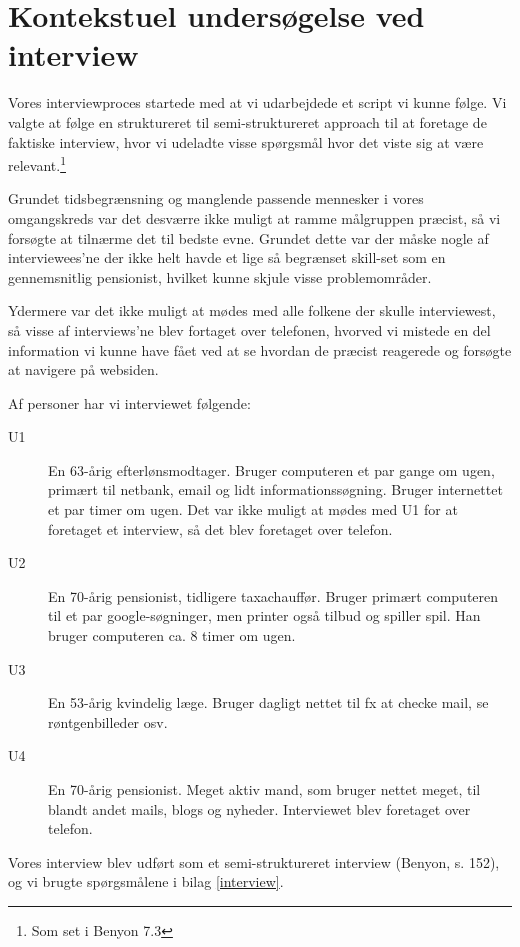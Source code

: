 \section{Kontekstuel undersøgelse ved interview}

Vores interviewproces startede med at vi udarbejdede et script vi kunne følge. Vi valgte at følge en struktureret til semi-struktureret approach til at foretage de faktiske interview, hvor vi udeladte visse spørgsmål hvor det viste sig at være relevant.\footnote{Som set i Benyon 7.3}

Grundet tidsbegrænsning og manglende passende mennesker i vores omgangskreds var det desværre ikke muligt at ramme målgruppen præcist, så vi forsøgte at tilnærme det til bedste evne. Grundet dette var der måske nogle af interviewees'ne der ikke helt havde et lige så begrænset skill-set som en gennemsnitlig pensionist, hvilket kunne skjule visse problemområder.

Ydermere var det ikke muligt at mødes med alle folkene der skulle interviewest, så visse af interviews'ne blev fortaget over telefonen, hvorved vi mistede en del information vi kunne have fået ved at se hvordan de præcist reagerede og forsøgte at navigere på websiden.

Af personer har vi interviewet følgende:

\begin{description}
    \item[U1] {
        En 63-årig efterlønsmodtager. Bruger computeren et par gange om ugen, primært til netbank, email og lidt informationssøgning. Bruger internettet et par timer om ugen. Det var ikke muligt at mødes med U1 for at foretaget et interview, så det blev foretaget over telefon.
    }
    \item[U2] {
        En 70-årig pensionist, tidligere taxachauffør. Bruger primært computeren til et par google-søgninger, men printer også tilbud og spiller spil. Han bruger computeren ca. 8 timer om ugen.
    }
    \item[U3] {
    En 53-årig kvindelig læge. Bruger dagligt nettet til fx at checke mail, se røntgenbilleder osv.
    }
    \item[U4] {
    En 70-årig pensionist. Meget aktiv mand, som bruger nettet meget, til blandt andet mails, blogs og nyheder. Interviewet blev foretaget over telefon.
    }
\end{description}

Vores interview blev udført som et semi-struktureret interview (Benyon, s. 152), og vi brugte spørgsmålene i bilag \ref{interview}.

